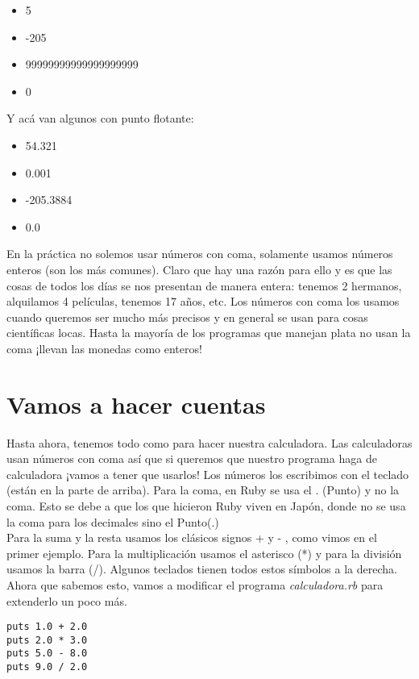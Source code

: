 \begin{itemize}
  \item 5
  \item -205
  \item 99999999999999999999
  \item 0
\end{itemize}

Y acá van algunos con punto flotante: 

\begin{itemize}
  \item 54.321
  \item 0.001
  \item -205.3884
  \item 0.0
\end{itemize}

En la práctica no solemos usar  números con coma, solamente usamos números enteros (son los más comunes). Claro que hay una razón para ello y es que las cosas de todos los días se nos presentan de manera entera: tenemos 2 hermanos, alquilamos 4 películas, tenemos 17 años, etc. Los números con coma los usamos cuando queremos ser mucho más precisos y en general se usan para cosas científicas locas. Hasta la mayoría de los programas que manejan plata no usan la coma ¡llevan las monedas como enteros!

\section{Vamos a hacer cuentas}
Hasta ahora, tenemos todo como para hacer nuestra calculadora. Las calculadoras usan números con coma así que si queremos que nuestro programa haga de calculadora ¡vamos a tener que usarlos! Los números los escribimos con el teclado (están en la parte de arriba). Para la coma, en Ruby se usa el . (Punto) y no la coma.  Esto se debe a que los que hicieron Ruby viven en Japón, donde no se usa la coma para los decimales sino el Punto(.)\\

Para la suma y la resta usamos los clásicos signos + y - , como vimos en el primer ejemplo. Para la multiplicación usamos el asterisco (*) y para la división usamos la barra (/). Algunos teclados tienen todos estos símbolos a la derecha.\\

Ahora que sabemos esto, vamos a modificar el programa \emph{calculadora.rb} para extenderlo un poco más. 

\begin{lstlisting}
puts 1.0 + 2.0
puts 2.0 * 3.0
puts 5.0 - 8.0
puts 9.0 / 2.0
\end{lstlisting}

